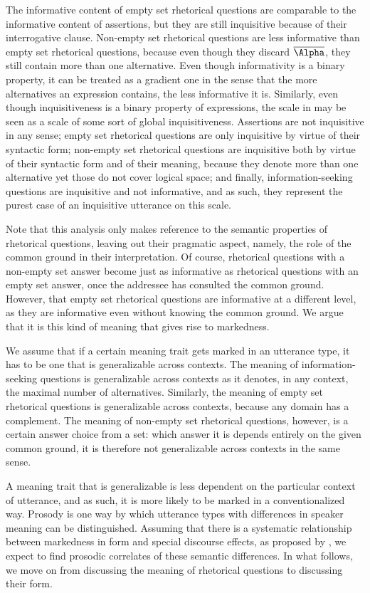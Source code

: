 \documentclass[output=paper,colorlinks,citecolor=brown            ,chinesefont]{langscibook}
\begin{document}
The informative content of empty set rhetorical questions are comparable to the informative content of assertions, but they are still inquisitive because of their interrogative clause. Non-empty set rhetorical questions are less informative than empty set rhetorical questions, because even though they discard $\overline{\Alpha}$, they still contain more than one alternative. Even though informativity is a binary property, it can be treated as a gradient one in the sense that the more alternatives an expression contains, the less informative it is. Similarly, even though inquisitiveness is a binary property of expressions, the scale in  may be seen as a scale of some sort of global inquisitiveness. Assertions are not inquisitive in any sense; empty set rhetorical questions are only inquisitive by virtue of their syntactic form; non-empty set rhetorical questions are inquisitive both by virtue of their syntactic form and of their meaning, because they denote more than one alternative yet those do not cover logical space; and finally, information-seeking questions are inquisitive and not informative, and as such, they represent the purest case of an inquisitive utterance on this scale.

Note that this analysis only makes reference to the semantic properties of rhetorical questions, leaving out their pragmatic aspect, namely, the role of the common ground in their interpretation. Of course, rhetorical questions with a non-empty set answer become just as informative as rhetorical questions with an empty set answer, once the addressee has consulted the common ground. However, that empty set rhetorical questions are informative at a different level, as they are informative even without knowing the common ground. We argue that it is this kind of meaning that gives rise to markedness.

We assume that if a certain meaning trait gets marked in an utterance type, it has to be one that is generalizable across contexts. The meaning of information-seeking questions is generalizable across contexts as it denotes, in any context, the maximal number of alternatives. Similarly, the meaning of empty set rhetorical questions is generalizable across contexts, because any domain has a complement. The meaning of non-empty set rhetorical questions, however, is a certain answer choice from a set: which answer it is depends entirely on the given common ground, it is therefore not generalizable across contexts in the same sense.

\largerpage
A meaning trait that is generalizable is less dependent on the particular context of utterance, and as such, it is more likely to be marked in a conventionalized way. Prosody is one way by which utterance types with differences in speaker meaning can be distinguished. Assuming that there is a systematic relationship between markedness in form and special discourse effects, as proposed by \citet{Farkas+2017}, we expect to find prosodic correlates of these semantic differences. In what follows, we move on from discussing the meaning of rhetorical questions to discussing their form. 
\end{document}
